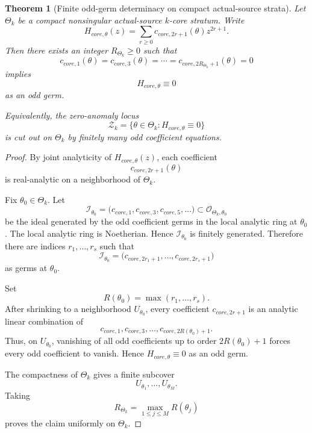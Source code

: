 \documentclass[11pt,a4paper]{amsart}
\def\core{core}%
\theoremstyle{plain}
\newtheorem{theorem}{Theorem}[section]
\theoremstyle{definition}
\newcommand{\core}{\mathrm{core}}
\begin{document}
\begin{theorem}[Finite odd-germ determinacy on compact actual-source strata]
\label{thm:finite-odd-germ-determinacy-actual-source}
Let \(\Theta_k\) be a compact nonsingular actual-source \(k\)-core stratum.
Write
\[
H_{\core,\theta}(z)
=
\sum_{r\ge0}c_{\core,2r+1}(\theta)z^{2r+1}.
\]
Then there exists an integer \(R_{\Theta_k}\ge0\) such that
\[
c_{\core,1}(\theta)=c_{\core,3}(\theta)=\cdots
=c_{\core,2R_{\Theta_k}+1}(\theta)=0
\]
implies
\[
H_{\core,\theta}\equiv0
\]
as an odd germ.

Equivalently, the zero-anomaly locus
\[
\mathcal Z_k
=
\{\theta\in\Theta_k:H_{\core,\theta}\equiv0\}
\]
is cut out on \(\Theta_k\) by finitely many odd coefficient equations.
\end{theorem}

\begin{proof}
By joint analyticity of \(H_{\core,\theta}(z)\), each coefficient
\[
c_{\core,2r+1}(\theta)
\]
is real-analytic on a neighborhood of \(\Theta_k\).

Fix \(\theta_0\in\Theta_k\).  Let
\[
\mathcal I_{\theta_0}
=
\bigl(c_{\core,1},c_{\core,3},c_{\core,5},\ldots\bigr)
\subset
\mathcal O_{\Theta_k,\theta_0}
\]
be the ideal generated by the odd coefficient germs in the local analytic ring
at \(\theta_0\).  The local analytic ring is Noetherian.  Hence
\(\mathcal I_{\theta_0}\) is finitely generated.  Therefore there are indices
\(r_1,\ldots,r_s\) such that
\[
\mathcal I_{\theta_0}
=
\bigl(
c_{\core,2r_1+1},\ldots,c_{\core,2r_s+1}
\bigr)
\]
as germs at \(\theta_0\).

Set
\[
R(\theta_0)=\max(r_1,\ldots,r_s).
\]
After shrinking to a neighborhood \(U_{\theta_0}\), every coefficient
\(c_{\core,2r+1}\) is an analytic linear combination of
\[
c_{\core,1},c_{\core,3},\ldots,c_{\core,2R(\theta_0)+1}.
\]
Thus, on \(U_{\theta_0}\), vanishing of all odd coefficients up to order
\(2R(\theta_0)+1\) forces every odd coefficient to vanish.  Hence
\(H_{\core,\theta}\equiv0\) as an odd germ.

The compactness of \(\Theta_k\) gives a finite subcover
\[
U_{\theta_1},\ldots,U_{\theta_M}.
\]
Taking
\[
R_{\Theta_k}
=
\max_{1\le j\le M}R(\theta_j)
\]
proves the claim uniformly on \(\Theta_k\).
\end{proof}
\end{document}
